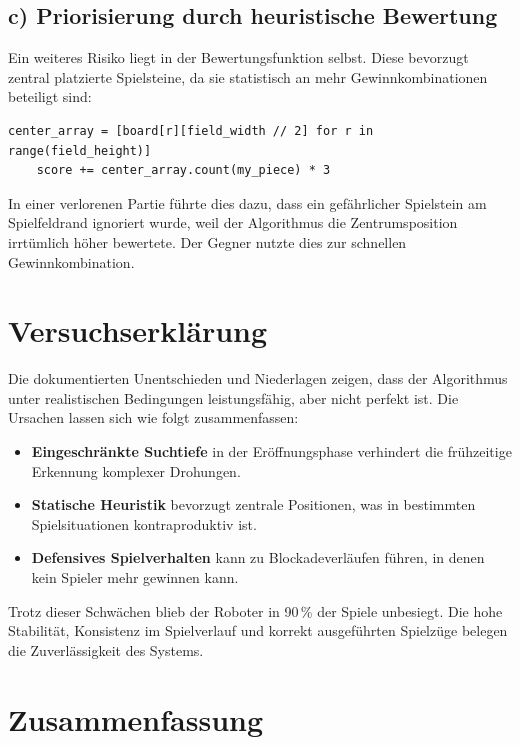 \subsection*{c) Priorisierung durch heuristische Bewertung}

Ein weiteres Risiko liegt in der Bewertungsfunktion selbst. Diese bevorzugt zentral platzierte Spielsteine, da sie statistisch an mehr Gewinnkombinationen beteiligt sind:

\begin{lstlisting}[style=pythonstyle]
	center_array = [board[r][field_width // 2] for r in range(field_height)]
	score += center_array.count(my_piece) * 3
\end{lstlisting}

In einer verlorenen Partie führte dies dazu, dass ein gefährlicher Spielstein am Spielfeldrand ignoriert wurde, weil der Algorithmus die Zentrumsposition irrtümlich höher bewertete. Der Gegner nutzte dies zur schnellen Gewinnkombination.

\section{Versuchserklärung}

Die dokumentierten Unentschieden und Niederlagen zeigen, dass der Algorithmus unter realistischen Bedingungen leistungsfähig, aber nicht perfekt ist. Die Ursachen lassen sich wie folgt zusammenfassen:

\begin{itemize}
	\item \textbf{Eingeschränkte Suchtiefe} in der Eröffnungsphase verhindert die frühzeitige Erkennung komplexer Drohungen.
	\item \textbf{Statische Heuristik} bevorzugt zentrale Positionen, was in bestimmten Spielsituationen kontraproduktiv ist.
	\item \textbf{Defensives Spielverhalten} kann zu Blockadeverläufen führen, in denen kein Spieler mehr gewinnen kann.
\end{itemize}

Trotz dieser Schwächen blieb der Roboter in 90\,\% der Spiele unbesiegt. Die hohe Stabilität, Konsistenz im Spielverlauf und korrekt ausgeführten Spielzüge belegen die Zuverlässigkeit des Systems.

\section{Zusammenfassung}

